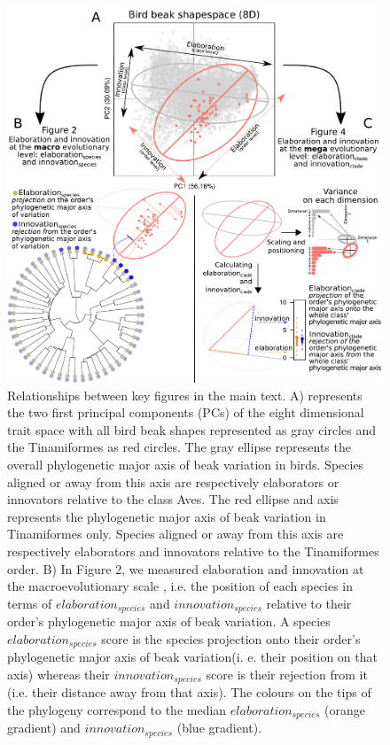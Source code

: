 \documentclass[12pt,letterpaper]{article}
\begin{document}
\begin{figure}[!htbp]
\centering
   \includegraphics[width=1\textwidth]{Figures/cheat_sheet.pdf}
\caption{\scriptsize{Relationships between key figures in the main text.
A) represents the two first principal components (PCs) of the eight dimensional trait space with all bird beak shapes represented as gray circles and the Tinamiformes as red circles.
The gray ellipse represents the overall phylogenetic major axis of beak variation in birds.
Species aligned or away from this axis are respectively elaborators or innovators relative to the class Aves.
The red ellipse and axis represents the phylogenetic major axis of beak variation in Tinamiformes only.
Species aligned or away from this axis are respectively elaborators and innovators relative to the Tinamiformes order.
B) In Figure 2, we measured elaboration and innovation at the macroevolutionary scale , i.e. the position of each species in terms of $elaboration_{species}$ and $innovation_{species}$ relative to their order's phylogenetic major axis of beak variation.
A species $elaboration_{species}$ score is the species projection onto their order's phylogenetic major axis of beak variation(i. e. their position on that axis) whereas their $innovation_{species}$ score is their rejection from it (i.e. their distance away from that axis).
The colours on the tips of the phylogeny correspond to the median $elaboration_{species}$ (orange gradient) and $innovation_{species}$ (blue gradient).
}}
\end{figure}
\end{document}
